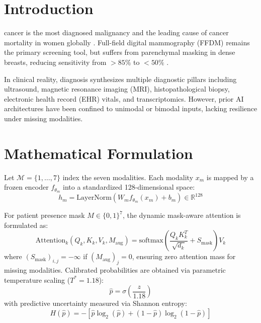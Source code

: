 \documentclass[11pt,journal,compsoc]{IEEEtran}
\begin{document}
\maketitle
\IEEEdisplaynontitleabstractindextext
\IEEEpeerreviewmaketitle

\section{Introduction}
 cancer is the most diagnosed malignancy and the leading cause of cancer mortality in women globally \cite{sung2021global}. Full-field digital mammography (FFDM) remains the primary screening tool, but suffers from parenchymal masking in dense breasts, reducing sensitivity from $>85\%$ to $<50\%$ \cite{kerlikowske2015performance}. 

In clinical reality, diagnosis synthesizes multiple diagnostic pillars including ultrasound, magnetic resonance imaging (MRI), histopathological biopsy, electronic health record (EHR) vitals, and transcriptomics. However, prior AI architectures \cite{mckinney2020international, shen2021artificial, yala2021toward, zhang2023multimodal} have been confined to unimodal or bimodal inputs, lacking resilience under missing modalities.

\section{Mathematical Formulation}
Let $\mathcal{M} = \{1, \dots, 7\}$ index the seven modalities. Each modality $x_m$ is mapped by a frozen encoder $f_{\theta_m}$ into a standardized 128-dimensional space:
\begin{equation}
h_m = \text{LayerNorm}\left(W_m f_{\theta_m}(x_m) + b_m\right) \in \mathbb{R}^{128}
\end{equation}

For patient presence mask $M \in \{0, 1\}^7$, the dynamic mask-aware attention is formulated as:
\begin{equation}
\text{Attention}_k(Q_k, K_k, V_k, M_{\text{aug}}) = \text{softmax}\left(\frac{Q_k K_k^T}{\sqrt{d_k}} + S_{\text{mask}}\right) V_k
\end{equation}
where $(S_{\text{mask}})_{i, j} = -\infty$ if $(M_{\text{aug}})_j = 0$, ensuring zero attention mass for missing modalities. Calibrated probabilities are obtained via parametric temperature scaling ($T^* = 1.18$):
\begin{equation}
\hat{p} = \sigma\left(\frac{z}{1.18}\right)
\end{equation}
with predictive uncertainty measured via Shannon entropy:
\begin{equation}
H(\hat{p}) = -\left[\hat{p}\log_2(\hat{p}) + (1-\hat{p})\log_2(1-\hat{p})\right]
\end{equation}
\end{document}
